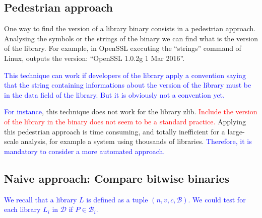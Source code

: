 \documentclass{article}
\newcommand{\ludo}[1]{\textcolor{blue}{#1}}
\newcommand{\thom}[1]{\textcolor{red}{#1}}
\begin{document}
	\subsection{Pedestrian approach}
    
        One way to find the version of a library binary consists in a
        pedestrian approach. 
        Analysing the symbols or the strings of the binary we can find what is
        the version of the library. For example, in OpenSSL executing the
        ``strings'' command of Linux, outputs the version: ``OpenSSL 1.0.2g  1
        Mar 2016''. 

        \ludo{This technique can work if developers of the library apply a
        convention saying that the string containing informations about the
        version of the library must be in the data field of the library. But
        it is obviously not a convention yet.}

        \ludo{For instance}, this technique does not work for the library zlib. 
        \thom{Include the version of the library in the binary does not seem
        to be a standard practice.}
        Applying this pedestrian approach is time consuming, and totally
        inefficient for a large-scale analysis, for example a system using
        thousands of libraries. \ludo{Therefore, it is mandatory to consider a
        more automated approach.}

    

    \subsection{Naive approach: Compare bitwise binaries }
    \label{naive-notations}

    \ludo{We recall that a library $L$ is defined as a tuple $(n, v, c,
    \mathcal{B})$. We could test for each library $L_i$ in $\mathcal{D}$ if $P \in
    \mathcal{B}_i$.} 
\end{document}
